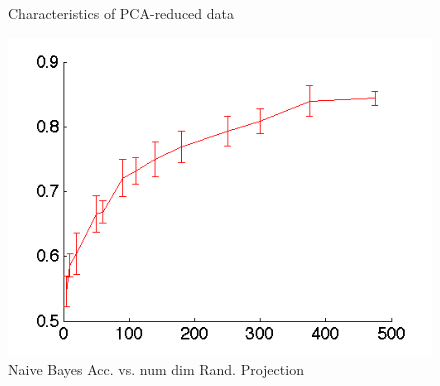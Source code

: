 \documentclass[]{article}
\begin{document}
\begin{figure}[h!]
\centering
{}
\caption{Characteristics of PCA-reduced data}
\label{fig:PCA_RED}
\end{figure}

\begin{center}
\begin{figure}[h!]
\centering
\includegraphics[width=.5\textwidth]{../images/accuracy_vs_dim_randproj.png}
\caption{Naive Bayes Acc. vs. num dim Rand. Projection}
\label{fig:nb_rand_proj}
\end{figure}
\end{center}

\end{document}
